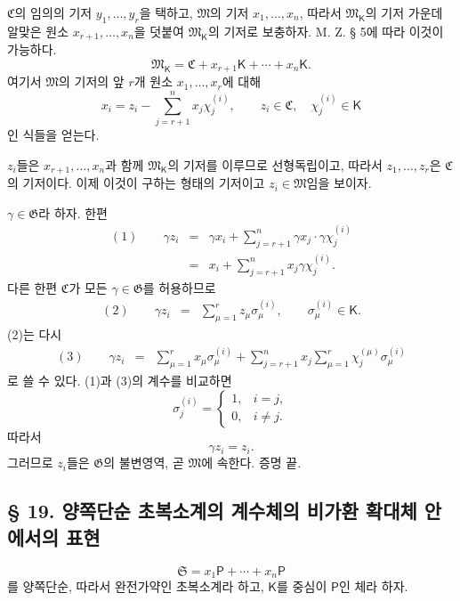 \(\mathfrak C\)의 임의의 기저 \(y_1,\ldots,y_r\)을 택하고, \(\mathfrak M\)의 기저 \(x_1,\ldots,x_n\), 따라서 \(\mathfrak M_{\mathsf K}\)의 기저 가운데 알맞은 원소 \(x_{r+1},\ldots,x_n\)을 덧붙여 \(\mathfrak M_{\mathsf K}\)의 기저로 보충하자. M. Z. § 5에 따라 이것이 가능하다.
\[
        \mathfrak M_{\mathsf K}
        =\mathfrak C+x_{r+1}\mathsf K+\cdots+x_n\mathsf K.
\]
여기서 \(\mathfrak M\)의 기저의 앞 \(r\)개 원소 \(x_1,\ldots,x_r\)에 대해
\[
        x_i=z_i-\sum_{j=r+1}^{n}x_j\chi_j^{(i)},
        \qquad
        z_i\in\mathfrak C,\quad
        \chi_j^{(i)}\in\mathsf K
\]
인 식들을 얻는다.

\(z_i\)들은 \(x_{r+1},\ldots,x_n\)과 함께 \(\mathfrak M_{\mathsf K}\)의 기저를 이루므로 선형독립이고, 따라서 \(z_1,\ldots,z_r\)은 \(\mathfrak C\)의 기저이다. 이제 이것이 구하는 형태의 기저이고 \(z_i\in\mathfrak M\)임을 보이자.

\(\gamma\in\mathfrak G\)라 하자. 한편
\[
\begin{array}{rcl}
(1)\qquad \gamma z_i
&=&\displaystyle
\gamma x_i+\sum_{j=r+1}^{n}
\gamma x_j\cdot\gamma\chi_j^{(i)}\\
&=&\displaystyle
x_i+\sum_{j=r+1}^{n}x_j\gamma\chi_j^{(i)}.
\end{array}
\]
다른 한편 \(\mathfrak C\)가 모든 \(\gamma\in\mathfrak G\)를 허용하므로
\[
\begin{array}{rcl}
(2)\qquad
\gamma z_i
&=&\displaystyle
\sum_{\mu=1}^{r}z_\mu\sigma_\mu^{(i)},
\qquad
\sigma_\mu^{(i)}\in\mathsf K.
\end{array}
\]
(2)는 다시
\[
\begin{array}{rcl}
(3)\qquad
\gamma z_i
&=&\displaystyle
\sum_{\mu=1}^{r}x_\mu\sigma_\mu^{(i)}
+\sum_{j=r+1}^{n}x_j
 \sum_{\mu=1}^{r}
 \chi_j^{(\mu)}\sigma_\mu^{(i)}
\end{array}
\]
로 쓸 수 있다. (1)과 (3)의 계수를 비교하면
\[
        \sigma_j^{(i)}
        =\begin{cases}
          1,&i=j,\\
          0,&i\ne j.
        \end{cases}
\]
따라서
\[
        \gamma z_i=z_i.
\]
그러므로 \(z_i\)들은 \(\mathfrak G\)의 불변영역, 곧 \(\mathfrak M\)에 속한다. 증명 끝.

\subsection*{§ 19. 양쪽단순 초복소계의 계수체의 비가환 확대체 안에서의 표현}

\[
        \mathfrak S
        =x_1\mathsf P+\cdots+x_n\mathsf P
\]
를 양쪽단순, 따라서 완전가약인 초복소계라 하고, \(\mathsf K\)를 중심이 \(\mathsf P\)인 체라 하자.

